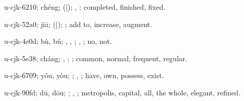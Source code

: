 \begin{multicols}{2}
{\cjkgGlue{}u-cjk-6210; chéng; \cjkgGlue{}\cjkgGlue{}(\cjkgGlue{}|\cjkgGlue{}); \cjkgGlue{}, \cjkgGlue{}; completed, finished, fixed.

\cjkgGlue{}u-cjk-52a0; jiā; \cjkgGlue{}\cjkgGlue{}(\cjkgGlue{}|\cjkgGlue{}); \cjkgGlue{}; add to, increase, augment.

\cjkgGlue{}u-cjk-4e0d; bù, bú; \cjkgGlue{}, \cjkgGlue{}, \cjkgGlue{}; \cjkgGlue{}, \cjkgGlue{}; no, not.

\cjkgGlue{}u-cjk-5e38; cháng; \cjkgGlue{}, \cjkgGlue{}; \cjkgGlue{}; common, normal, frequent, regular.

\cjkgGlue{}u-cjk-6709; yǒu, yòu; \cjkgGlue{}\cjkgGlue{}\cjkgGlue{}; \cjkgGlue{}, \cjkgGlue{}; have, own, possess, exist.

\cjkgGlue{}u-cjk-90fd; dū, dōu; \cjkgGlue{}; \cjkgGlue{}, \cjkgGlue{}; metropolis, capital, all, the whole, elegant, refined.

}
\end{multicols}
